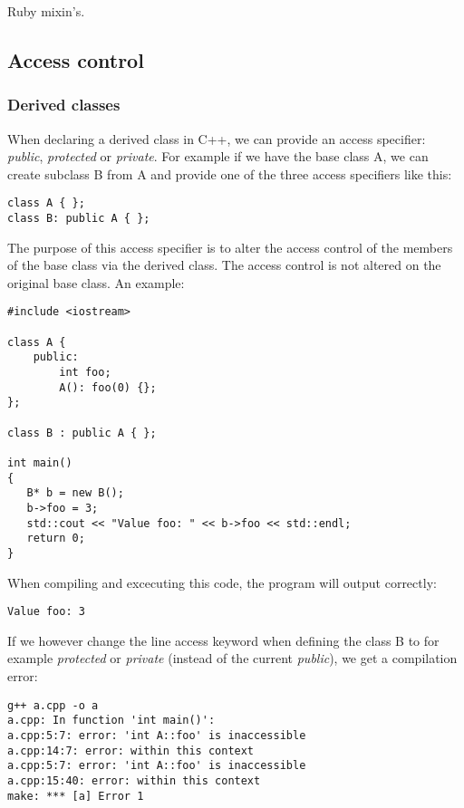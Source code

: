 \documentclass[10pt,a4paper,twocolumn]{article}
\begin{document}
Ruby mixin's.

\subsection{Access control}

\subsubsection{Derived classes}
When declaring a derived class in C++, we can provide an access specifier: \textit{public}, \textit{protected} or \textit{private}. For example if we have the base class A, we can create subclass B from A and provide one of the three access specifiers like this:

\begin{lstlisting}
class A { };
class B: public A { };
\end{lstlisting}

The purpose of this access specifier is to alter the access control of the members of the base class via the derived class. The access control is not altered on the original base class. An example:

\begin{lstlisting}
#include <iostream>

class A {
	public:
		int foo;
		A(): foo(0) {};
};

class B : public A { };
 
int main()
{
   B* b = new B();
   b->foo = 3;
   std::cout << "Value foo: " << b->foo << std::endl;
   return 0;
}
\end{lstlisting}

When compiling and excecuting this code, the program will output correctly:
\begin{lstlisting}
Value foo: 3
\end{lstlisting}

If we however change the line access keyword when defining the class B to for example \textit{protected} or \textit{private} (instead of the current \textit{public}), we get a compilation error: 

\begin{lstlisting}
g++ a.cpp -o a
a.cpp: In function 'int main()':
a.cpp:5:7: error: 'int A::foo' is inaccessible
a.cpp:14:7: error: within this context
a.cpp:5:7: error: 'int A::foo' is inaccessible
a.cpp:15:40: error: within this context
make: *** [a] Error 1
\end{lstlisting}
\end{document}

